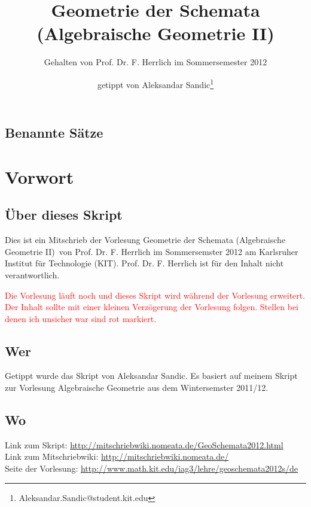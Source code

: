 \documentclass[paper = A4, fontsize=12pt, numbers=noendperiod, chapterprefix=true]{scrbook}
\title{Geometrie der Schemata\\(Algebraische Geometrie II)}
\subtitle{Gehalten von Prof. Dr. F. Herrlich im Sommersemester 2012}
\author{getippt von Aleksandar Sandic\thanks{Aleksandar.Sandic@student.kit.edu}}
\theoremstyle{break}
\theoremstyle{nonumberbreak}
\theoremstyle{nonumberplain}
\begin{document}
\maketitle

\setlength\parskip{0.6pt}
\tableofcontents

\section*{Benannte S\"atze}


\setlength\parskip{\smallskipamount}



\chapter{Vorwort}
\setcounter{secnumdepth}{2}
\section*{\"Uber dieses Skript}
Dies ist ein Mitschrieb der Vorlesung \glqq Geometrie der Schemata (Algebraische Geometrie II)\grqq\ von Prof. Dr. F. Herrlich im Sommersemster 2012 am Karlsruher Institut f\"ur Technologie (KIT). Prof. Dr. F. Herrlich ist f\"ur  den Inhalt nicht verantwortlich.

\textcolor{red}{Die Vorlesung l\"auft noch und dieses Skript wird w\"ahrend der Vorlesung erweitert. Der Inhalt sollte mit einer kleinen Verz\"ogerung der Vorlesung folgen. Stellen bei denen ich unsicher war sind rot markiert.}
\section*{Wer}
Getippt wurde das Skript von Aleksandar Sandic. Es basiert auf meinem Skript zur Vorlesung Algebraische Geometrie aus dem Wintersemster 2011/12.

\section*{Wo}
Link zum Skript: \url{http://mitschriebwiki.nomeata.de/GeoSchemata2012.html}\\
Link zum Mitschriebwiki: \url{http://mitschriebwiki.nomeata.de/}\\
Seite der Vorlesung: \url{http://www.math.kit.edu/iag3/lehre/geoschemata2012s/de}
\end{document}
